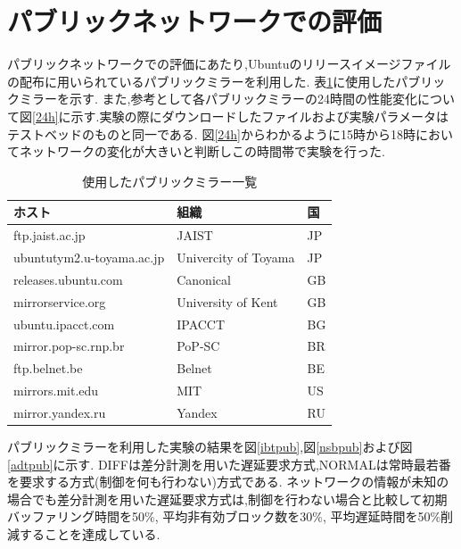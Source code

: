 \documentclass[a4j,12pt]{gradthesis_utf8}
\begin{document}
\clearpage

\section{パブリックネットワークでの評価}
\label{pub}
パブリックネットワークでの評価にあたり,Ubuntuのリリースイメージファイルの配布に用いられているパブリックミラーを利用した.
表\ref{tablemirror}に使用したパブリックミラーを示す.
また,参考として各パブリックミラーの24時間の性能変化について図\ref{24h}に示す.実験の際にダウンロードしたファイルおよび実験パラメータはテストベッドのものと同一である.
図\ref{24h}からわかるように15時から18時においてネットワークの変化が大きいと判断しこの時間帯で実験を行った.
\begin{table}[htb]
	\begin{center}
		\caption{使用したパブリックミラー一覧}
		\label{tablemirror}
		\begin{tabular}{|l|l|l|} \hline
			ホスト & 組織 & 国\\ \hline \hline
			ftp.jaist.ac.jp & JAIST & JP \\
			ubuntutym2.u-toyama.ac.jp & Univercity of Toyama & JP \\
			releases.ubuntu.com & Canonical & GB \\
			mirrorservice.org & University of Kent & GB \\
			ubuntu.ipacct.com & IPACCT & BG \\
			mirror.pop-sc.rnp.br & PoP-SC & BR \\
			ftp.belnet.be & Belnet & BE \\
			mirrors.mit.edu & MIT & US \\
			mirror.yandex.ru & Yandex & RU \\ \hline
		\end{tabular}
	\end{center}
\end{table}

パブリックミラーを利用した実験の結果を図\ref{ibtpub},図\ref{nsbpub}および図\ref{adtpub}に示す.
DIFFは差分計測を用いた遅延要求方式,NORMALは常時最若番を要求する方式(制御を何も行わない)方式である.
ネットワークの情報が未知の場合でも差分計測を用いた遅延要求方式は,制御を行わない場合と比較して初期バッファリング時間を50\%, 平均非有効ブロック数を30\%, 平均遅延時間を50\%削減することを達成している.
\end{document}
